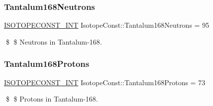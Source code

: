 \subsubsection{\texorpdfstring{Tantalum168\+Neutrons}{Tantalum168Neutrons}}
{\footnotesize\ttfamily \mbox{\hyperlink{group___isotope_const-_macros_ga5f18360b3e99483a35c32d789e62621c}{I\+S\+O\+T\+O\+P\+E\+C\+O\+N\+S\+T\+\_\+\+I\+NT}} Isotope\+Const\+::\+Tantalum168\+Neutrons = 95}

\$ \$ Neutrons in Tantalum-\/168. \mbox{\label{group___isotope_const-_tantalum-_ta168_ga2e843164ac4b4289cc676ac64ec1335c}} 
\subsubsection{\texorpdfstring{Tantalum168\+Protons}{Tantalum168Protons}}
{\footnotesize\ttfamily \mbox{\hyperlink{group___isotope_const-_macros_ga5f18360b3e99483a35c32d789e62621c}{I\+S\+O\+T\+O\+P\+E\+C\+O\+N\+S\+T\+\_\+\+I\+NT}} Isotope\+Const\+::\+Tantalum168\+Protons = 73}

\$ \$ Protons in Tantalum-\/168. 